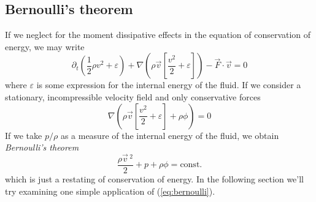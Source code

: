 \subsection*{Bernoulli's theorem}
If we neglect for the moment dissipative effects in the equation of conservation of energy, we may write 
\begin{equation*}
    \partial_{t}\left(\frac{1}{2}\rho v^{2}+\varepsilon\right) +\nabla\left(\rho\vec{v}\left[\frac{v^{2}}{2}+\varepsilon\right]\right) - \vec{F}\cdot\vec{v}= 0 
\end{equation*}
where $\varepsilon$ is some expression for the internal energy of the fluid. If we consider a stationary, incompressible velocity field and only conservative forces
\begin{equation*}
    \nabla \left(\rho\vec{v}\left[\frac{v^{2}}{2}+\varepsilon\right]+\rho\phi\right) = 0
\end{equation*}
If we take $p/\rho$ as a measure of the internal energy of the fluid, we obtain \emph{Bernoulli's theorem}
\begin{equation}
    \frac{\rho\vec{v}\,^{2}}{2}+p+\rho\phi = \text{const.}
    \label{eq:bernoulli}
\end{equation}
which is just a restating of conservation of energy. In the following section we'll try examining one simple application of (\ref{eq:bernoulli}).

